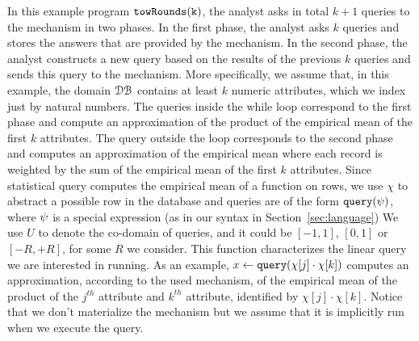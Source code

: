 \begin{example}[twoRounds]
    \label{ex:twoRounds}
    In this example program $\mathtt{towRounds(k)}$, the analyst asks in total $k+1$ queries to the mechanism in two phases.
    In the first phase, the analyst asks $k$ queries and stores the answers that are provided by the mechanism. 
    In the second phase, the analyst constructs a new query based on the results of the previous $k$ queries and sends this query to the mechanism. More specifically, we assume that, in this example, the domain $\mathcal{DB}$ 
    contains at least $k$ numeric attributes, which we index just by natural numbers. 
    The queries inside the while loop correspond to the first phase and compute an approximation of 
    the product of the empirical mean of the first $k$ attributes. 
    The query outside the loop corresponds to the second phase and computes an approximation of the empirical mean where each record is weighted by the sum of the empirical mean of the first $k$ attributes.
    {Since statistical query computes the empirical mean of a function on rows, we use $\chi$ to abstract a possible row in the database and }
    queries are of the form ${\tt query}(\psi)$, where $\psi$ is a special expression 
    (as in our syntax in Section~\ref{sec:language})
    {
      We use $U$ to denote the co-domain of queries, and it could be $[-1,1]$, $[0,1]$ or $[-R,+R]$, for some $R$ we consider.
      This function characterizes the linear query we are interested in running. 
      As an example, $x \leftarrow {\tt query}(\chi[j] \cdot \chi[k])$ computes an approximation, according to the used mechanism, of the empirical mean of the product of the $j^{th}$ attribute and $k^{th}$ attribute, identified by $\chi[j] \cdot \chi[k]$. Notice that we don't materialize the mechanism but we assume that it is implicitly run when we execute the query. } 


\end{example}
